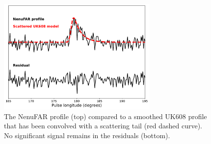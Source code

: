 \begin{figure}
    \begin{center}
        \includegraphics[width=0.7\textwidth]{Figures/J0250/nenufar_scattering.pdf}
        \caption[Evidence for scattering in the NenuFAR profile of PSR~J0250+5854]{The NenuFAR profile (top) compared to a smoothed UK608 profile that has been convolved with a scattering tail (red dashed curve). No significant signal remains in the residuals (bottom).}
        \label{fig: J0250 - nenufar scattering}
    \end{center}
\end{figure}

